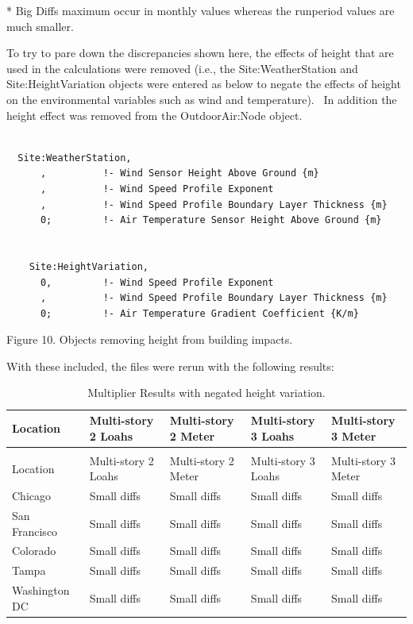 * Big Diffs maximum occur in monthly values whereas the runperiod values are much smaller.

To try to pare down the discrepancies shown here, the effects of height that are used in the calculations were removed (i.e., the Site:WeatherStation and Site:HeightVariation objects were entered as below to negate the effects of height on the environmental variables such as wind and temperature).~ In addition the height effect was removed from the OutdoorAir:Node object.

\begin{lstlisting}

  Site:WeatherStation,
      ,          !- Wind Sensor Height Above Ground {m}
      ,          !- Wind Speed Profile Exponent
      ,          !- Wind Speed Profile Boundary Layer Thickness {m}
      0;         !- Air Temperature Sensor Height Above Ground {m}


    Site:HeightVariation,
      0,         !- Wind Speed Profile Exponent
      ,          !- Wind Speed Profile Boundary Layer Thickness {m}
      0;         !- Air Temperature Gradient Coefficient {K/m}
\end{lstlisting}

Figure 10. Objects removing height from building impacts.

With these included, the files were rerun with the following results:

\begin{longtable}[c]{p{1.2in}p{1.2in}p{1.2in}p{1.2in}p{1.2in}}
\caption{Multiplier Results with negated height variation. \label{table:multiplier-results-with-negated-height}} \tabularnewline
\toprule 
Location & Multi-story 2 Loahs & Multi-story 2 Meter & Multi-story 3 Loahs & Multi-story 3 Meter \tabularnewline
\midrule
\endfirsthead

\caption[]{Multiplier Results with negated height variation.} \tabularnewline
\toprule 
Location & Multi-story 2 Loahs & Multi-story 2 Meter & Multi-story 3 Loahs & Multi-story 3 Meter \tabularnewline
\midrule
\endhead

Chicago & Small diffs & Small diffs & Small diffs & Small diffs \tabularnewline
San Francisco & Small diffs & Small diffs & Small diffs & Small diffs \tabularnewline
Colorado & Small diffs & Small diffs & Small diffs & Small diffs \tabularnewline
Tampa & Small diffs & Small diffs & Small diffs & Small diffs \tabularnewline
Washington DC & Small diffs & Small diffs & Small diffs & Small diffs \tabularnewline
\bottomrule
\end{longtable}

